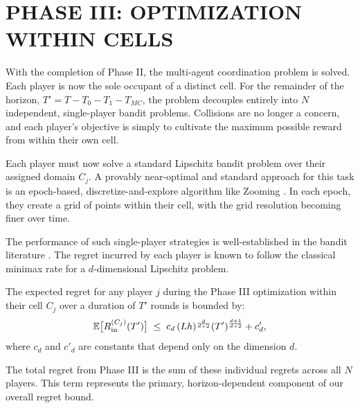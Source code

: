 

\section{PHASE III: OPTIMIZATION WITHIN CELLS}
\label{sec:phase3}

With the completion of Phase II, the multi-agent coordination problem is solved. Each player is now the sole occupant of a distinct cell. For the remainder of the horizon, $T' = T - T_0 - T_1 - T_{MC}$, the problem decouples entirely into $N$ independent, single-player bandit problems. Collisions are no longer a concern, and each player's objective is simply to cultivate the maximum possible reward from within their own cell.

Each player must now solve a standard Lipschitz bandit problem over their assigned domain $C_j$. A provably near-optimal and standard approach for this task is an epoch-based, discretize-and-explore algorithm like Zooming \citep{Kleinberg}. In each epoch, they create a grid of points within their cell, with the grid resolution becoming finer over time.

The performance of such single-player strategies is well-established in the bandit literature \citep{bubeck2012regret,slivkins2019introduction}. The regret incurred by each player is known to follow the classical minimax rate for a $d$-dimensional Lipschitz problem.

\begin{proposition}
\label{prop:in-cell}
The expected regret for any player $j$ during the Phase III optimization within their cell $C_j$ over a duration of $T'$ rounds is bounded by:
\[
\mathbb{E}\big[R_{\mathrm{in}}^{(C_j)}(T')\big] \;\le\; c_d\, (Lh)^{\frac{d}{d+2}} (T')^{\frac{d+1}{d+2}} + c'_d,
\]
where $c_d$ and $c'_d$ are constants that depend only on the dimension $d$.
\end{proposition}

The total regret from Phase III is the sum of these individual regrets across all $N$ players. This term represents the primary, horizon-dependent component of our overall regret bound. 
